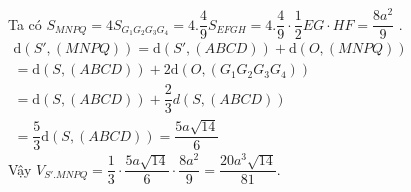 \begin{ex}
{		Ta có $S_{MNPQ}=4S_{G_1G_2G_3G_4}=4.\dfrac{4}{9}{S_{EFGH}}=4.\dfrac{4}{9}\cdot\dfrac{1}{2}EG\cdot HF=\dfrac{8a^2}{9}$ .\\
		$\begin{array}{l}
			\mathrm{d}\left(S',\left(MNPQ\right)\right)=\mathrm{d}\left(S',\left(ABCD\right)\right)+\mathrm{d}\left(O,\left(MNPQ\right)\right)\\
			=\mathrm{d}\left(S,\left(ABCD\right)\right)+2\mathrm{d}\left(O,\left(G_1G_2G_3G_4\right)\right)\\
			=\mathrm{d}\left(S,\left(ABCD\right)\right)+\dfrac{2}{3}d\left(S,\left(ABCD\right)\right)\\
			=\dfrac{5}{3}\mathrm{d}\left(S,\left(ABCD\right)\right)=\dfrac{5a\sqrt{14}}{6}
		\end{array}$\\
		Vậy $V_{S'.MNPQ}=\dfrac{1}{3}\cdot\dfrac{5a\sqrt{14}}{6}\cdot\dfrac{8a^2}{9}=\dfrac{20a^3\sqrt{14}}{81}$.}
\end{ex}

